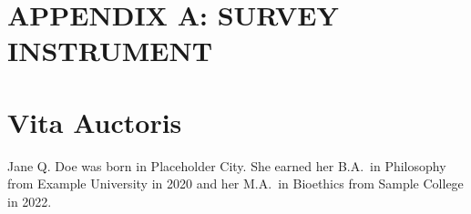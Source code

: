 \documentclass[12pt,oneside]{book}
\begin{document}
\appendix
\chapter{APPENDIX A: SURVEY INSTRUMENT}
\lipsum[12]

\backmatter
\singlespacing
\doublespacing

\chapter*{Vita Auctoris}
Jane Q. Doe was born in Placeholder City. She earned her B.A.\ in Philosophy
from Example University in 2020 and her M.A.\ in Bioethics from Sample College
in 2022.
\end{document}
